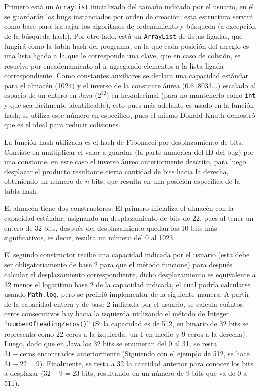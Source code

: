 \documentclass[12pt,letterpaper]{article}
\begin{document}
Primero está un \texttt{ArrayList} inicializado del tamaño indicado por el usuario, en él se guardarán los bugs instanciados por orden de creación; esta estructura servirá como base para trabajar los algoritmos de ordenamiento y búsqueda (a excepción de la búsqueda hash). Por otro lado, está un \texttt{ArrayList} de listas ligadas, que fungirá como la tabla hash del programa, en la que cada posición del arreglo es una lista ligada a la que le corresponde una clave, que en caso de colisión, se resuelve por encadenamiento al ir agregando elementos a la lista ligada correspondiente. Como constantes auxiliares se declara una capacidad estándar para el almacén (1024) y el inverso de la constante áurea ($0.618033\dots$) escalado al espacio de un entero en Java ($2^{32}$) en hexadecimal (para no mantenerlo como \texttt{int} y que sea fácilmente identificable), esto pues más adelante es usado en la función hash; se utiliza este número en específico, pues el mismo Donald Knuth demostró que es el ideal para reducir colisiones.

La función hash utilizada es el hash de Fibonacci por desplazamiento de bits. Consiste en multiplicar el valor a guardar (la parte numérica del ID del bug) por una constante, en este caso el inverso áureo anteriormente descrito, para luego desplazar el producto resultante cierta cantidad de bits hacia la derecha, obteniendo un número de $n$ bits, que resulta en una posición específica de la tabla hash.

El almacén tiene dos constructores: El primero inicializa el almacén con la capacidad estándar, asignando un desplazamiento de bits de 22, pues al tener un entero de 32 bits, después del desplazamiento quedan los 10 bits más significativos, es decir, resulta un número del 0 al 1023.

El segundo constructor recibe una capacidad indicada por el usuario (esta debe ser obligatoriamente de base 2 para que el método funcione) para después calcular el desplazamiento correspondiente, dicho desplazamiento es equivalente a 32 menos el logaritmo base 2 de la capacidad indicada, el cual podría calcularse usando \texttt{Math.log}, pero se prefirió implementar de la siguiente manera: A partir de la capacidad entera y de base 2 indicada por el usuario, se calcula cuántos ceros consecutivos hay hacia la izquierda utilizando el método de Integer ``\texttt{numberOfLeadingZeros()}'' (Si la capacidad es de 512, en binario de 32 bits se representa como 22 ceros a la izquierda, un 1 en medio y 9 ceros a la derecha). Luego, dado que en Java los 32 bits se enumeran del 0 al 31, se resta $31 - \text{ceros encontrados anteriormente}$ (Siguiendo con el ejemplo de 512, se hace $31 - 22 = 9$). Finalmente, se resta a 32 la cantidad anterior para conocer los bits a desplazar ($32 - 9 = 23$ bits, resultando en un número de 9 bits que va de 0 a 511).
\end{document}
